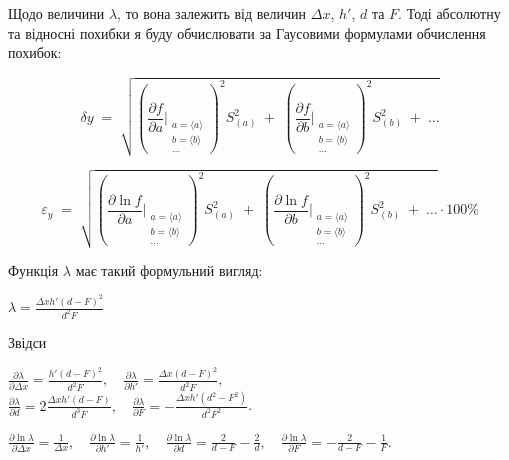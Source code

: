 \documentclass[12pt,a4paper]{article}
\begin{document}
    Щодо величини $\lambda$, то вона залежить від величин $\Delta x$, $h'$, $d$ та $F$. Тоді абсолютну та відносні похибки я буду обчислювати за Гаусовими формулами обчислення похибок:

    \[
        \delta y \;=\;
        \sqrt{
        \left(
            \frac{\partial f}{\partial a}\Bigg|_{\substack{a=\langle a\rangle \\ b=\langle b\rangle \\ \dots}}
        \right)^{2} S_{(a)}^{2}
        \;+\;
        \left(
            \frac{\partial f}{\partial b}\Bigg|_{\substack{a=\langle a\rangle \\ b=\langle b\rangle \\ \dots}}
        \right)^{2} S_{(b)}^{2}
        \;+\;\dots
        }
    \]

    \[
        \varepsilon_y \;=\;
        \sqrt{
        \left(
            \frac{\partial \ln f}{\partial a}\Bigg|_{\substack{a=\langle a\rangle \\ b=\langle b\rangle \\ \dots}}
        \right)^{2} S_{(a)}^{2}
        \;+\;
        \left(
            \frac{\partial \ln f}{\partial b}\Bigg|_{\substack{a=\langle a\rangle \\ b=\langle b\rangle \\ \dots}}
        \right)^{2} S_{(b)}^{2}
        \;+\;\dots
        } \cdot 100 \%
    \]

    Функція $\lambda$ має такий формульний вигляд:

    \begin{center}
        $\displaystyle \lambda = \frac{\Delta xh' \left( d - F \right)^2}{d^2 F}$
    \end{center}

    Звідси

    \begin{center}
    
        $\displaystyle \frac{\partial \lambda}{\partial \Delta x} = \frac{h' (d - F)^2}{d^2 F}, \quad
        \frac{\partial \lambda}{\partial h'} = \frac{\Delta x (d - F)^2}{d^2 F}, \quad$ \\[0.5em]
        $\displaystyle \frac{\partial \lambda}{\partial d} = 2\frac{\Delta x h' (d - F)}{d^3 F}, \quad
        \frac{\partial \lambda}{\partial F} = -\frac{\Delta x h' \left( d^2 - F^2 \right)}{d^2 F^2}$.

    \end{center}

    \begin{center}
        $\displaystyle \frac{\partial \ln \lambda}{\partial \Delta x} = \frac{1}{\Delta x}, \quad
        \frac{\partial \ln \lambda}{\partial h'} = \frac{1}{h'}, \quad
        \frac{\partial \ln \lambda}{\partial d} = \frac{2}{d - F} - \frac{2}{d}, \quad
        \frac{\partial \ln \lambda}{\partial F} = -\frac{2}{d - F} - \frac{1}{F}.$
    \end{center}
\end{document}
